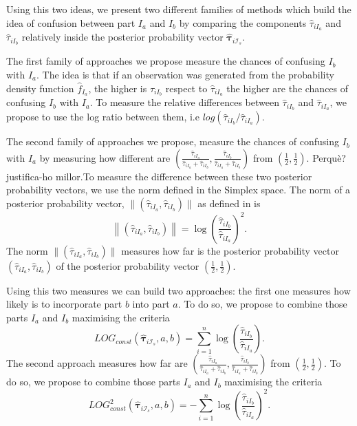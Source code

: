 \documentclass[10pt, a4paper]{article}
\newcommand{\m}[1]{\boldsymbol{#1}}
\begin{document}
Using this two ideas, we present two different families of methods which build the idea of confusion between part $I_a$ and $I_b$ by comparing the components $\hat{\tau}_{iI_a}$ and $\hat{\tau}_{iI_b}$ relatively inside the posterior probability vector $\hat{\m \tau}_{i \mathcal{I}_s}$.

The first family of approaches we propose measure the chances of confusing $I_b$ with $I_a$. The idea is that if an observation was generated from the probability density function $\hat{f}_{I_a}$, the higher is $\hat{\tau}_{iI_b}$ respect to $\hat{\tau}_{iI_a}$ the higher are the chances of confusing $I_b$ with $I_a$. To measure the relative differences between  $\hat{\tau}_{iI_b}$ and $\hat{\tau}_{iI_a}$, we propose to use the log ratio between them, i.e $log( \hat{\tau}_{iI_b}/\hat{\tau}_{iI_a})$.

The second family of approaches we propose, measure the chances of confusing $I_b$ with $I_a$  by measuring how different are $(\frac{\hat{\tau}_{iI_a}}{\hat{\tau}_{iI_a} + \hat{\tau}_{iI_b}}, \frac{\hat{\tau}_{iI_b}}{\hat{\tau}_{iI_a} + \hat{\tau}_{iI_b}})$ from $(\frac{1}{2}, \frac{1}{2})$. {\color{blue} Perqu\`{e}? justifica-ho millor.}To measure the difference between these two posterior probability vectors, we use the norm defined in the Simplex space. The norm of a posterior probability vector, $\| (\hat{\tau}_{iI_a}, \hat{\tau}_{iI_b}) \|$  as defined in \cite{aitchison2002simplicial} is
\[
\left\| (\hat{\tau}_{iI_a}, \hat{\tau}_{iI_b}) \right\| = \log \left(\frac{ \hat{\tau}_{iI_b} }{ \hat{\tau}_{iI_a} }\right)^2.
\]
The norm $\| (\hat{\tau}_{iI_a}, \hat{\tau}_{iI_b}) \|$ measures how far is the posterior probability vector $(\hat{\tau}_{iI_a}, \hat{\tau}_{iI_b})$ of the posterior probability vector $(\frac{1}{2}, \frac{1}{2})$.

Using this two measures we can build two approaches: the first one measures how likely is to incorporate part $b$ into part $a$. To do so, we propose to combine those parts $I_a$ and $I_b$ maximising the criteria
\[
LOG_{const}( \hat{\m \tau}_{i \mathcal{I}_s}, a, b) = \sum_{i=1}^n \log \left(\frac{ \hat{\tau}_{iI_b} }{ \hat{\tau}_{iI_a} }\right).
\]
The second approach measures how far are $(\frac{\hat{\tau}_{iI_a}}{\hat{\tau}_{iI_a} + \hat{\tau}_{iI_b}}, \frac{\hat{\tau}_{iI_b}}{\hat{\tau}_{iI_a} + \hat{\tau}_{iI_b}})$ from $(\frac{1}{2}, \frac{1}{2})$. To do so, we propose to combine those parts $I_a$ and $I_b$ maximising the criteria
\[
LOG^2_{const}( \hat{\m \tau}_{i \mathcal{I}_s}, a, b) = -\sum_{i=1}^n \log \left(\frac{ \hat{\tau}_{iI_b} }{ \hat{\tau}_{iI_a} }\right)^2.
\]
\end{document}
